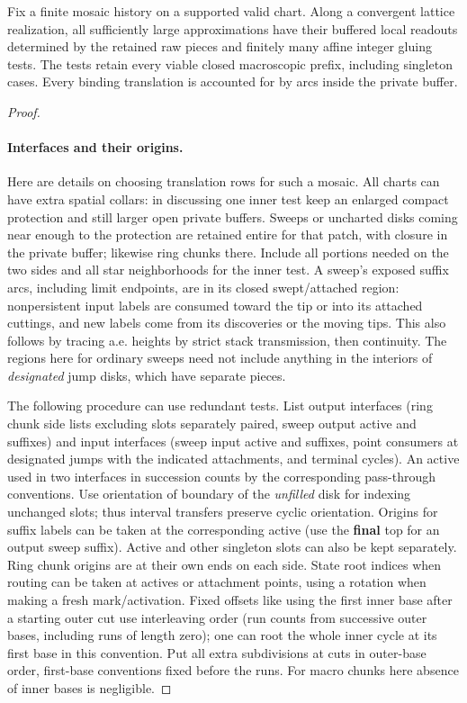 \begin{proposition}\label{kern:local-projections}
Fix a finite mosaic history on a supported valid chart. Along a convergent lattice realization,
all sufficiently large approximations have their buffered local readouts determined by the retained
raw pieces and finitely many affine integer gluing tests. The tests retain every viable
closed macroscopic prefix, including singleton cases. Every binding translation is accounted for
by arcs inside the private buffer.
\end{proposition}
\begin{proof}\leavevmode

\paragraph{Interfaces and their origins.}

Here are details on choosing translation rows for such a mosaic. All charts can have extra spatial collars:
in discussing one inner test keep an enlarged compact protection and still larger open private buffers.
Sweeps or uncharted disks coming near enough to the protection are retained entire for that patch, with
closure in the private buffer; likewise ring chunks there. Include all portions needed on the two sides and
all star neighborhoods for the inner test. A sweep's exposed suffix arcs, including limit endpoints, are in
its closed swept/attached region: nonpersistent input labels are consumed toward the tip or into its
attached cuttings, and new labels come from its discoveries or the moving tips. This also follows by tracing
a.e. heights by strict stack transmission, then continuity. The regions here for ordinary sweeps need not
include anything in the interiors of \emph{designated} jump disks, which have separate pieces.

The following procedure can use redundant tests. List output interfaces (ring chunk side lists excluding
slots separately paired, sweep output active and suffixes) and input interfaces (sweep input active and
suffixes, point consumers at designated jumps with the indicated attachments, and terminal cycles). An
active used in two interfaces in succession counts by the corresponding pass-through conventions. Use
orientation of boundary of the \emph{unfilled} disk for indexing unchanged slots; thus interval transfers
preserve cyclic orientation. Origins for suffix labels can be taken at the corresponding active (use the
\textbf{final} top for an output sweep suffix). Active and other singleton slots can also be kept
separately. Ring chunk origins are at their own ends on each side. State root indices when routing can be
taken at actives or attachment points, using a rotation when making a fresh mark/activation. Fixed offsets
like using the first inner base after a starting outer cut use interleaving order (run counts from
successive outer bases, including runs of length zero); one can root the whole inner cycle at its first base
in this convention. Put all extra subdivisions at cuts in outer-base order, first-base conventions fixed
before the runs. For macro chunks here absence of inner bases is negligible.


\end{proof}
